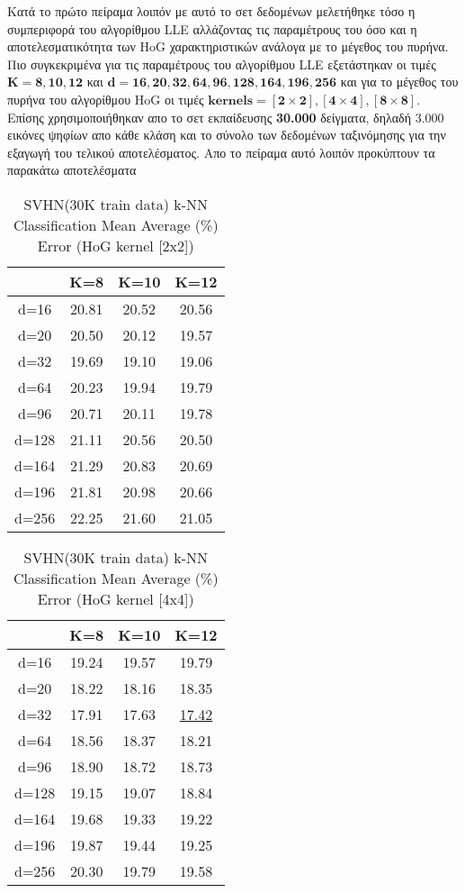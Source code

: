 \par
Κατά το πρώτο πείραμα λοιπόν με αυτό το σετ δεδομένων μελετήθηκε τόσο η συμπεριφορά του αλγορίθμου \textlatin{LLE} αλλάζοντας τις παραμέτρους του όσο και η αποτελεσματικότητα των \textlatin{HoG} χαρακτηριστικών ανάλογα με το μέγεθος του πυρήνα. Πιο συγκεκριμένα για τις παραμέτρους του αλγορίθμου \textlatin{LLE} εξετάστηκαν οι τιμές $\mathbf{Κ=8,10,12}$ και $\mathbf{d=16,20,32,64,96,128,164,196,256}$ και για το μέγεθος του πυρήνα του αλγορίθμου \textlatin{HoG} οι τιμές $\mathbf{kernels=[2\times2],[4\times4],[8\times8]}$. Επίσης χρησιμοποιήθηκαν απο το σετ εκπαίδευσης \textbf{30.000} δείγματα, δηλαδή 3.000 εικόνες ψηφίων απο κάθε κλάση και το σύνολο των δεδομένων ταξινόμησης για την εξαγωγή του τελικού αποτελέσματος. Απο το πείραμα αυτό λοιπόν προκύπτουν τα παρακάτω αποτελέσματα
\begin{table}[H]
\centering
\label{tab:table11}
\begin{tabular}{|c|c|c|c|}
\hline
 & K=8 & K=10 & K=12 \\
\hline
d=16 & 20.81 & 20.52 & 20.56 \\
d=20 & 20.50 & 20.12 & 19.57 \\
d=32 & 19.69 & 19.10 & 19.06 \\
d=64 & 20.23 & 19.94 & 19.79 \\
d=96 & 20.71 & 20.11 & 19.78 \\
d=128 & 21.11 & 20.56 & 20.50 \\
d=164 & 21.29 & 20.83 & 20.69 \\
d=196 & 21.81 & 20.98 & 20.66 \\
d=256 & 22.25 & 21.60 & 21.05 \\
\hline
\end{tabular}
\caption{SVHN(30K train data) k-NN Classification Mean Average (\%) Error (HoG kernel [2x2])}
\end{table}

\begin{table}[H]
\centering
\label{tab:table12}
\begin{tabular}{|c|c|c|c|}
\hline
 & K=8 & K=10 & K=12 \\
\hline
d=16 & 19.24 & 19.57 & 19.79 \\
d=20 & 18.22 & 18.16 & 18.35 \\
d=32 & 17.91 & 17.63 & \underline{17.42} \\
d=64 & 18.56 & 18.37 & 18.21 \\
d=96 & 18.90 & 18.72 & 18.73 \\
d=128 & 19.15 & 19.07 & 18.84 \\
d=164 & 19.68 & 19.33 & 19.22 \\
d=196 & 19.87 & 19.44 & 19.25 \\
d=256 & 20.30 & 19.79 & 19.58 \\
\hline
\end{tabular}
\caption{SVHN(30K train data) k-NN Classification Mean Average (\%) Error (HoG kernel [4x4])}
\end{table}

